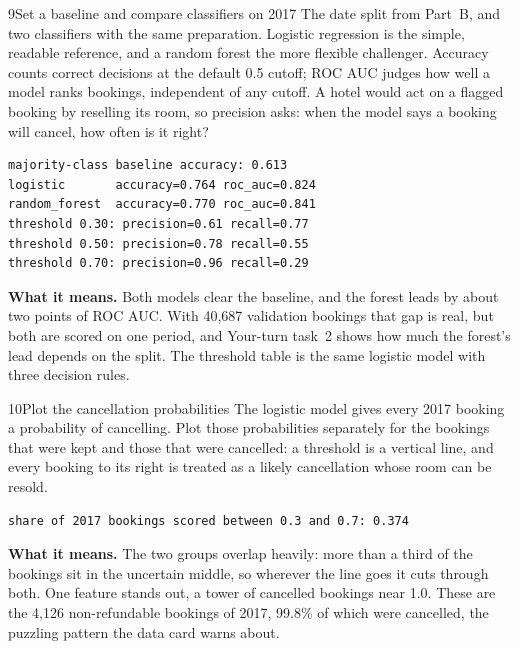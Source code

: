 \begin{labquestion}{9}{Set a baseline and compare classifiers on 2017}
The date split from Part~B, and two classifiers with the same preparation. Logistic regression is the simple, readable reference, and a random forest the more flexible challenger. Accuracy counts correct decisions at the default 0.5 cutoff; ROC AUC judges how well a model ranks bookings, independent of any cutoff. A hotel would act on a flagged booking by reselling its room, so precision asks: when the model says a booking will cancel, how often is it right?
\end{labquestion}
\begin{labanswer}

\begin{refoutput}
\begin{lstlisting}[style=utpterminal]
majority-class baseline accuracy: 0.613
logistic       accuracy=0.764 roc_auc=0.824
random_forest  accuracy=0.770 roc_auc=0.841
threshold 0.30: precision=0.61 recall=0.77
threshold 0.50: precision=0.78 recall=0.55
threshold 0.70: precision=0.96 recall=0.29
\end{lstlisting}
\end{refoutput}

\textbf{What it means.} Both models clear the baseline, and the forest leads by about two points of ROC AUC. With 40,687 validation bookings that gap is real, but both are scored on one period, and Your-turn task~2 shows how much the forest's lead depends on the split. The threshold table is the same logistic model with three decision rules.
\end{labanswer}

\begin{labquestion}{10}{Plot the cancellation probabilities}
The logistic model gives every 2017 booking a probability of cancelling. Plot those probabilities separately for the bookings that were kept and those that were cancelled: a threshold is a vertical line, and every booking to its right is treated as a likely cancellation whose room can be resold.
\end{labquestion}
\begin{labanswer}

\begin{refoutput}
\begin{lstlisting}[style=utpterminal]
share of 2017 bookings scored between 0.3 and 0.7: 0.374
\end{lstlisting}
\end{refoutput}

\textbf{What it means.} The two groups overlap heavily: more than a third of the bookings sit in the uncertain middle, so wherever the line goes it cuts through both. One feature stands out, a tower of cancelled bookings near 1.0. These are the 4,126 non-refundable bookings of 2017, 99.8\% of which were cancelled, the puzzling pattern the data card warns about.
\end{labanswer}


